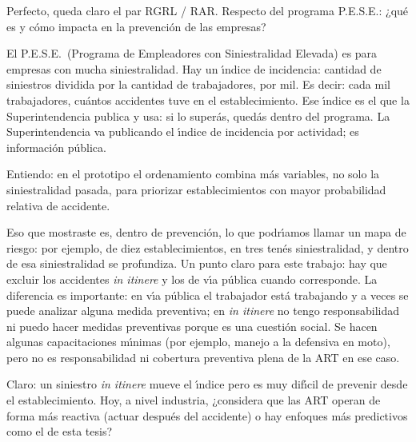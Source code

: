 \begin{description}[style=nextline, leftmargin=0cm, labelsep=0.35cm]
\item[\textbf{Entrevistador:}]
Perfecto, queda claro el par RGRL / RAR.
Respecto del programa P.E.S.E.: ¿qu\'e es y c\'omo impacta en la prevenci\'on de las empresas?

\item[\textbf{Entrevistado:}]
El P.E.S.E.\ (Programa de Empleadores con Siniestralidad Elevada) es para empresas con mucha siniestralidad.
Hay un \'{\i}ndice de incidencia: cantidad de siniestros dividida por la cantidad de trabajadores, por mil.
Es decir: cada mil trabajadores, cu\'antos accidentes tuve en el establecimiento.
Ese \'{\i}ndice es el que la Superintendencia publica y usa: si lo super\'as, qued\'as dentro del programa.
La Superintendencia va publicando el \'{\i}ndice de incidencia por actividad; es informaci\'on p\'ublica.

\item[\textbf{Entrevistador:}]
Entiendo: en el prototipo el ordenamiento combina m\'as variables, no solo la siniestralidad pasada, para priorizar establecimientos con mayor probabilidad relativa de accidente.

\item[\textbf{Entrevistado:}]
Eso que mostraste es, dentro de prevenci\'on, lo que podr\'{\i}amos llamar un mapa de riesgo: por ejemplo, de diez establecimientos, en tres ten\'es siniestralidad, y dentro de esa siniestralidad se profundiza.
Un punto claro para este trabajo: hay que excluir los accidentes \emph{in itinere} y los de v\'{\i}a p\'ublica cuando corresponde.
La diferencia es importante: en v\'{\i}a p\'ublica el trabajador est\'a trabajando y a veces se puede analizar alguna medida preventiva; en \emph{in itinere} no tengo responsabilidad ni puedo hacer medidas preventivas porque es una cuesti\'on social.
Se hacen algunas capacitaciones m\'{\i}nimas (por ejemplo, manejo a la defensiva en moto), pero no es responsabilidad ni cobertura preventiva plena de la ART en ese caso.

\item[\textbf{Entrevistador:}]
Claro: un siniestro \emph{in itinere} mueve el \'{\i}ndice pero es muy dif\'{\i}cil de prevenir desde el establecimiento.
Hoy, a nivel industria, ¿considera que las ART operan de forma m\'as reactiva (actuar despu\'es del accidente) o hay enfoques m\'as predictivos como el de esta tesis?


\end{description}
